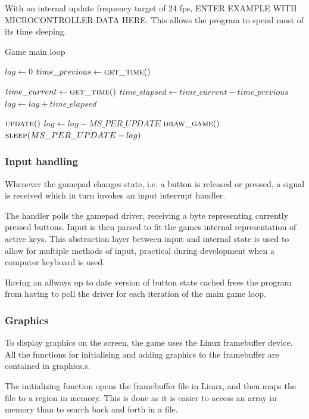 With an internal update frequency target of 24 fps, ENTER EXAMPLE WITH
MICROCONTROLLER DATA HERE.  This allows the program to spend most of its time
sleeping.

\begin{algorithm}
  \caption{Game main loop}
  \begin{algorithmic}
    \State $lag \gets 0$
    \State $time\_previous \gets \Call{get\_time}{\null}$

    \Loop
      \State $time\_current \gets \Call{get\_time}{\null}$
      \State $time\_elapsed \gets time\_current - time\_previous$
      \State $lag \gets lag + time\_elapsed$

        \State $\Call{update}{\null}$
        \State $lag \gets lag - MS\_PER\_UPDATE$
      \EndWhile
      \State $\Call{draw\_game}{\null}$
      \State $\Call{sleep}{MS\_PER\_UPDATE - lag}$
    \EndLoop
  \end{algorithmic}
\end{algorithm}

\subsubsection{Input handling}
Whenever the gamepad changes state, i.e. a button is released or pressed,
a signal is received which in turn invokes an input interrupt handler.

The handler polls the gamepad driver, receiving a byte representing currently
pressed buttons. Input is then parsed to fit the games internal representation
of active keys. This abstraction layer between input and internal state is used
to allow for multiple methods of input, practical during development when a
computer keyboard is used.

Having an allways up to date version of button state cached frees the program
from having to poll the driver for each iteration of the main game loop.

\subsubsection{Graphics}
To display graphics on the screen, the game uses the Linux framebuffer device.
All the functions for initialising and adding graphics to the framebuffer are
contained in graphics.s.

The initializing function opens the framebuffer file in Linux, and then maps the
file to a region in memory. This is done as it is easier to access an array in memory
than to search back and forth in a file.

